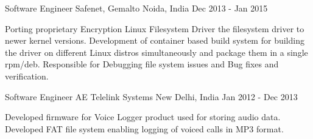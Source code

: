\begin{cventries}
  \cventry
    {Software Engineer}
    {Safenet, Gemalto}
    {Noida, India}
    {Dec 2013 - Jan 2015}
    {
      \begin{cvitems}
        \item {Porting proprietary Encryption Linux Filesystem Driver the filesystem driver to newer kernel versions. Development of container based build system for building the driver on different Linux distros simultaneously and package them in a single rpm/deb. Responsible for Debugging file system issues and Bug fixes and verification.}
      \end{cvitems}
    }	  
	  
  \cventry
    {Software Engineer}
    {AE Telelink Systems}
    {New Delhi, India}
    {Jan 2012 - Dec 2013}
    {
      \begin{cvitems}
        \item {Developed firmware for Voice Logger product used for storing audio data. Developed FAT file system enabling logging of voiced calls in MP3 format.}
      \end{cvitems}
    }  
\end{cventries}
